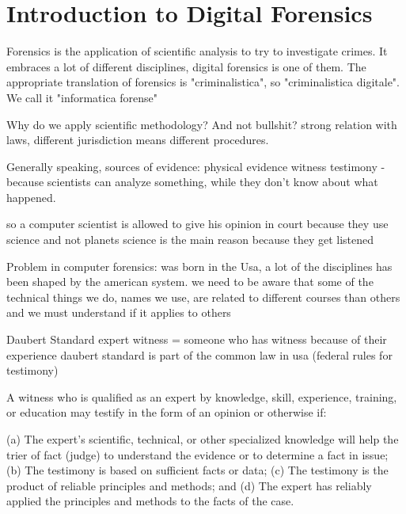 \chapter{Introduction to Digital Forensics}
\iffalse
    Forensics is the application of scientific analysis to try to investigate crimes.
    It embraces a lot of different disciplines, digital forensics is one of them.
    The appropriate translation of forensics is "criminalistica", so "criminalistica digitale".
    We call it "informatica forense"

    Why do we apply scientific methodology? And not  bullshit?
        strong relation with laws, different jurisdiction means different procedures.

        Generally speaking, sources of evidence:
            physical evidence
            witness testimony - because scientists can analyze something, while they don't know about what happened.

            so a computer scientist is allowed to give his opinion in court because they use science and not planets
            science is the main reason because they get listened

        Problem in computer forensics:
            was born in the Usa, a lot of the disciplines has been shaped by the american system.
            we need to be aware that some of the technical things we do, names we use, are related to different courses than others and we must understand if it applies to others
    
    Daubert Standard
        expert witness = someone who has witness because of their experience
        daubert standard is part of the common law in usa (federal rules for testimony)

        A witness who is qualified as an expert by knowledge,
        skill, experience, training, or education may testify in the
        form of an opinion or otherwise if:

        (a) The expert's scientific, technical, or other specialized
        knowledge will help the trier of fact (judge) to understand the
        evidence or to determine a fact in issue;
        (b) The testimony is based on sufficient facts or data; 
        (c) The testimony is the product of reliable principles
        and methods; and
        (d) The expert has reliably applied the principles and
        methods to the facts of the case.

